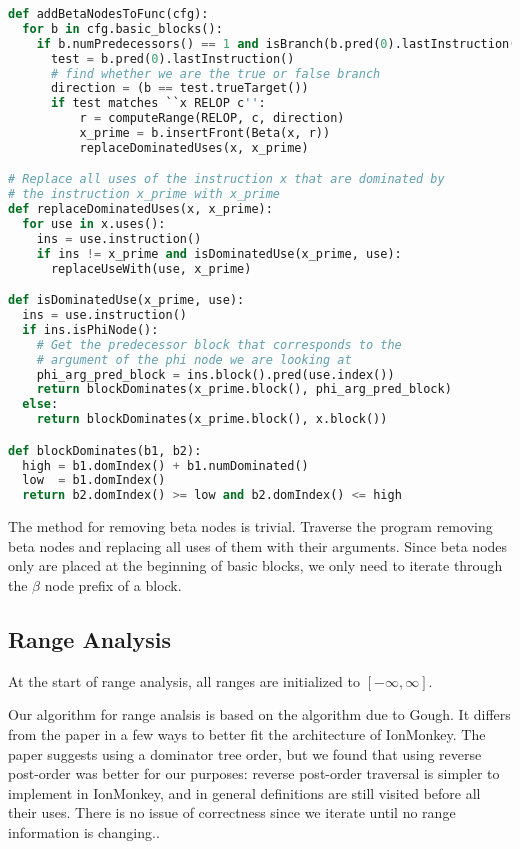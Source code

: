 \documentclass{article}
\begin{document}
\begin{lstlisting}[language=Python,
                   caption={Pseudocode algorithm for inserting beta nodes},
                   label={lst:add_betas}]
def addBetaNodesToFunc(cfg):
  for b in cfg.basic_blocks():
    if b.numPredecessors() == 1 and isBranch(b.pred(0).lastInstruction()):
      test = b.pred(0).lastInstruction()
      # find whether we are the true or false branch
      direction = (b == test.trueTarget())
      if test matches ``x RELOP c'':
          r = computeRange(RELOP, c, direction)
          x_prime = b.insertFront(Beta(x, r))
          replaceDominatedUses(x, x_prime)

# Replace all uses of the instruction x that are dominated by
# the instruction x_prime with x_prime
def replaceDominatedUses(x, x_prime):
  for use in x.uses():
    ins = use.instruction()
    if ins != x_prime and isDominatedUse(x_prime, use):
      replaceUseWith(use, x_prime)

def isDominatedUse(x_prime, use):
  ins = use.instruction()
  if ins.isPhiNode():
    # Get the predecessor block that corresponds to the
    # argument of the phi node we are looking at
    phi_arg_pred_block = ins.block().pred(use.index())
    return blockDominates(x_prime.block(), phi_arg_pred_block)
  else:
    return blockDominates(x_prime.block(), x.block())

def blockDominates(b1, b2):
  high = b1.domIndex() + b1.numDominated()
  low  = b1.domIndex()
  return b2.domIndex() >= low and b2.domIndex() <= high
\end{lstlisting}

The method for removing beta nodes is trivial. Traverse the program
removing beta nodes and replacing all uses of them with their
arguments. Since beta nodes only are placed at the beginning of basic
blocks, we only need to iterate through the $\beta$ node prefix of a
block.

\subsection{Range Analysis}

At the start of range analysis, all ranges are initialized to
$[-\infty, \infty]$.

Our algorithm for range analsis is based on the algorithm due to Gough. It
differs from the paper in a few ways to better fit the architecture of
IonMonkey. The paper suggests using a dominator tree order, but we found that
using reverse post-order was better for our purposes: reverse post-order
traversal is simpler to implement in IonMonkey, and in general definitions are
still visited before all their uses. There is no issue of correctness since we
iterate until no range information is changing..
\end{document}
